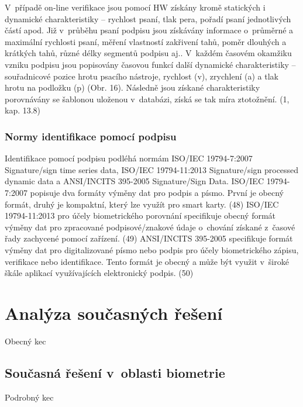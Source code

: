 V~případě on-line verifikace jsou pomocí HW získány kromě statických i dynamické
charakteristiky – rychlost psaní, tlak pera, pořadí psaní jednotlivých částí apod. Již v~průběhu
psaní podpisu jsou získávány informace o~průměrné a maximální rychlosti psaní, měření
vlastností zakřivení tahů, poměr dlouhých a krátkých tahů, různé délky segmentů podpisu aj..
V~každém časovém okamžiku vzniku podpisu jsou popisovány časovou funkcí další
dynamické charakteristiky – souřadnicové pozice hrotu psacího nástroje, rychlost (v),
zrychlení (a) a tlak hrotu na podložku (p) (Obr. 16). Následně jsou získané charakteristiky
porovnávány se šablonou uloženou v~databázi, získá se tak míra ztotožnění. (1, kap. 13.8) %


\subsection{Normy identifikace pomocí podpisu}
Identifikace pomocí podpisu podléhá normám ISO/IEC 19794-7:2007 Signature/sign time
series data, ISO/IEC 19794-11:2013 Signature/sign processed dynamic data a ANSI/INCITS
395-2005 Signature/Sign Data.
ISO/IEC 19794-7:2007 popisuje dva formáty výměny dat pro podpis a písmo. První je obecný
formát, druhý je kompaktní, který lze využít pro smart karty. (48) %
ISO/IEC 19794-11:2013 pro účely biometrického porovnání specifikuje obecný formát
výměny dat pro zpracované podpisové/znakové údaje o~chování získané z~časové řady
zachycené pomocí zařízení. (49) %
ANSI/INCITS 395-2005 specifikuje formát výměny dat pro digitalizované písmo nebo podpis
pro účely biometrického zápisu, verifikace nebo identifikace. Tento formát je obecný a může
být využit v~široké škále aplikací využívajících elektronický podpis. (50) %

\chapter{Analýza současných řešení}
Obecný kec

\section{Současná řešení v~oblasti biometrie}
Podrobný kec

